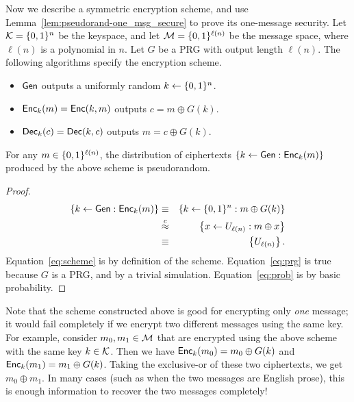 \documentclass[11pt]{article}
\begin{document}
Now we describe a symmetric encryption scheme, and use
Lemma~\ref{lem:pseudorand-one_msg_secure} to prove its one-message
security.  Let $\mathcal{K} = \{0,1\}^n$ be the keyspace, and let
$\mathcal{M} = \{0,1\}^{\ell(n)}$ be the message space, where $\ell(n)$ is
a polynomial in $n$.  Let $G$ be a PRG with output length $\ell(n)$.
The following algorithms specify the encryption scheme.
\begin{itemize}
\item $\mathsf{Gen}$ outputs a uniformly random $k \gets \{0,1\}^{n}$.
\item $\mathsf{Enc}_k(m) = \mathsf{Enc}(k,m)$ outputs $c = m \oplus G(k)$.
\item $\mathsf{Dec}_k(c) = \mathsf{Dec}(k, c)$ outputs $m = c \oplus G(k)$.
\end{itemize}

\begin{claim}
  For any $m \in \{0,1\}^{\ell(n)}$, the distribution of ciphertexts
  $\left\{ k \gets \mathsf{Gen} : \mathsf{Enc}_k(m) \right\}$ produced by the
  above scheme is pseudorandom.
\end{claim}

\begin{proof}
  \begin{eqnarray}
    \left\{ k \gets \mathsf{Gen} : \mathsf{Enc}_k(m) \right\} & \equiv &
    \left\{ k \gets \{0,1\}^{n} : m \oplus G(k) \right\} \label{eq:scheme} \\
    & \stackrel{c}{\approx} & \left\{ x \gets U_{\ell(n)} : m \oplus x
    \right\} \label{eq:prg} \\
    & \equiv & \left\{ U_{\ell(n)} \right\}. \label{eq:prob}
  \end{eqnarray}
  Equation~\eqref{eq:scheme} is by definition of the scheme.
  Equation~\eqref{eq:prg} is true because $G$ is a PRG, and by a
  trivial simulation.  Equation~\eqref{eq:prob} is by basic
  probability.
\end{proof}

Note that the scheme constructed above is good for encrypting only
\emph{one} message; it would fail completely if we encrypt two
different messages using the same key.  For example, consider $m_0,
m_1 \in \mathcal{M}$ that are encrypted using the above scheme with the
same key $k \in \mathcal{K}$.  Then we have $\mathsf{Enc}_k(m_0) = m_0 \oplus
G(k)$ and $\mathsf{Enc}_k(m_1) = m_1 \oplus G(k)$.  Taking the exclusive-or
of these two ciphertexts, we get $m_0 \oplus m_1$.  In many cases
(such as when the two messages are English prose), this is enough
information to recover the two messages completely!
\end{document}
